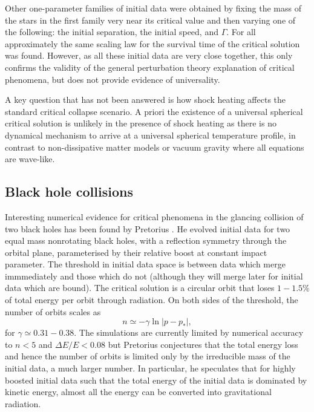 \documentclass{article}
\begin{document}
Other one-parameter families of initial data were obtained by fixing
the mass of the stars in the first family very near its critical value
and then varying one of the following: the initial separation, the
initial speed, and $\Gamma$. For all approximately the same scaling
law for the survival time of the critical solution was found. However,
as all these initial data are very close together, this only confirms
the validity of the general perturbation theory explanation of
critical phenomena, but does not provide evidence of universality.

A key question that has not been answered is how shock heating affects
the standard critical collapse scenario. A priori the existence of a
universal spherical critical solution is unlikely in the presence of
shock heating as there is no dynamical mechanism to arrive at a
universal spherical temperature profile, in contrast to
non-dissipative matter models or vacuum gravity where all equations
are wave-like.


\subsection{Black hole collisions}

Interesting numerical evidence for critical phenomena in the glancing
collision of two black holes has been found by Pretorius
\cite{Pretorius07}. He evolved initial data for two equal mass
nonrotating black holes, with a reflection symmetry through
the orbital plane, parameterised by their relative boost at constant
impact parameter. The threshold in initial data space is between data
which merge immmediately and those which do not (although they will
merge later for initial data which are bound). The critical solution
is a circular orbit that loses $1-1.5\%$ of total energy per orbit
through radiation. On both sides of the threshold, the number of
orbits scales as
\begin{equation}
\label{Pretoriusn}
n\simeq -\gamma\ln|p-p_*|,
\end{equation}
for $\gamma\simeq 0.31-0.38$. The simulations are currently limited by
numerical accuracy to $n<5$ and $\Delta E/E<0.08$ but Pretorius conjectures
that the total energy loss and hence the number of orbits is limited only
by the irreducible mass of the initial data, a much larger number. In
particular, he speculates that for highly boosted initial data such
that the total energy of the initial data is dominated by kinetic
energy, almost all the energy can be converted into gravitational
radiation. 
\end{document}

